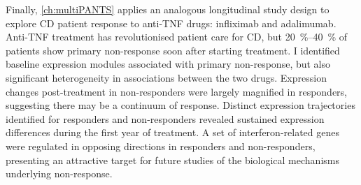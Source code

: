 Finally, \cref{ch:multiPANTS} applies an analogous longitudinal study design to explore \gls{CD} patient response to anti-\gls{TNF} drugs: infliximab and adalimumab.
Anti-\gls{TNF} treatment has revolutionised patient care for \gls{CD},
but \SIrange{20}{40}{\percent} of patients show primary non-response soon after starting treatment.
I identified baseline expression modules associated with primary non-response, but also significant heterogeneity in associations between the two drugs.
Expression changes post-treatment in non-responders were largely magnified in responders, suggesting there may be a continuum of response.
Distinct expression trajectories identified for responders and non-responders revealed sustained expression differences during the first year of treatment.
A set of interferon-related genes were regulated in opposing directions in responders and non-responders,
presenting an attractive target for future studies of the biological mechanisms underlying non-response.

